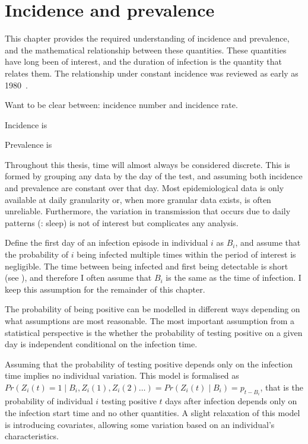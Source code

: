 \documentclass[thesis.tex]{subfiles}
\begin{document}
\chapter{Incidence and prevalence} \label{incidence-prevalence}

This chapter provides the required understanding of incidence and prevalence, and the mathematical relationship between these quantities.
These quantities have long been of interest, and the duration of infection is the quantity that relates them.
The relationship under constant incidence was reviewed as early as 1980~\autocite{freemanPrevalence}.

Want to be clear between: incidence number and incidence rate.

Incidence is

Prevalence is

Throughout this thesis, time will almost always be considered discrete.
This is formed by grouping any data by the day of the test, and assuming both incidence and prevalence are constant over that day.
Most epidemiological data is only available at daily granularity or, when more granular data exists, is often unreliable.
Furthermore, the variation in transmission that occurs due to daily patterns (\eg: sleep) is not of interest but complicates any analysis. 

Define the first day of an infection episode in individual $i$ as $B_i$, and assume that the probability of $i$ being infected multiple times within the period of interest is negligible.
The time between being infected and first being detectable is short (see ), and therefore I often assume that $B_i$ is the same as the time of infection.
I keep this assumption for the remainder of this chapter.

The probability of being positive can be modelled in different ways depending on what assumptions are most reasonable.
The most important assumption from a statistical perspective is the whether the probability of testing positive on a given day is independent conditional on the infection time.

Assuming that the probability of testing positive depends only on the infection time implies no individual variation.
This model is formalised as $Pr(Z_i(t) = 1 \mid B_i, Z_i(1), Z_i(2) \dots) = Pr(Z_i(t) \mid B_i) = p_{t-B_i}$, that is the probability of individual $i$ testing positive $t$ days after infection depends only on the infection start time and no other quantities.
A slight relaxation of this model is introducing covariates, allowing some variation based on an individual's characteristics.
\end{document}
